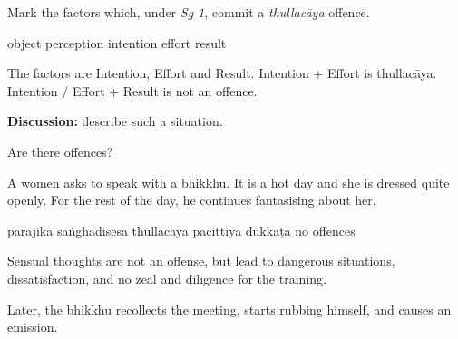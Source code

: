 \begin{exam}{\autoExamName}
\problemDivide

\begin{problem}

  Mark the factors which, under \textit{Sg 1}, commit a \textit{thullacāya} offence.

  \begin{answers}{6}
    \bChoices
     object\eAns
     perception\eAns
     intention\eAns
     effort\eAns
     result\eAns
    \eChoices
  \end{answers}

  \bigskip

  \begin{solution}
    The factors are Intention, Effort and Result. Intention + Effort is
    thullacāya. Intention / Effort + Result is not an offence.
  \end{solution}

  \textbf{Discussion:} describe such a situation.

\end{problem}

\problemDivide

\begin{problem*}

  Are there offences?

\begin{parts}

\item
  A women asks to speak with a bhikkhu.
  It is a hot day and she is dressed quite openly.
  For the rest of the day, he continues fantasising about her.

  \bigskip

  \begin{answers}{6}
    \bChoices
     pārājika\eAns
     saṅghādisesa\eAns
     thullacāya\eAns
     pācittiya\eAns
     dukkaṭa\eAns
     no offences\eAns
    \eChoices
  \end{answers}

  \begin{solution}
    Sensual thoughts are not an offense, but lead to dangerous situations,
    dissatisfaction, and no zeal and diligence for the training.
  \end{solution}

  \bigskip

  \item Later, the bhikkhu recollects the meeting, starts rubbing himself, and causes an emission.

  \bigskip


\end{parts}
\end{problem*}
\end{exam}
